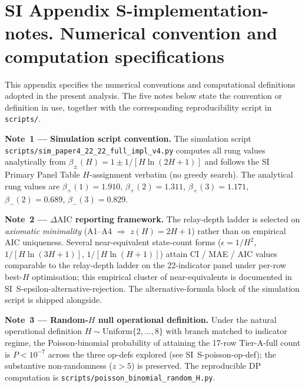
\clearpage
\section*{SI Appendix S-implementation-notes. Numerical convention and computation specifications}\label{sec:S-KNOWN-ISSUES-integrated}

\sloppy
This appendix specifies the numerical conventions and computational definitions adopted in the present analysis. The five notes below state the convention or definition in use, together with the corresponding reproducibility script in \texttt{scripts/}.

\textbf{Note~1 --- Simulation script convention.} The simulation script \texttt{scripts/sim\_paper4\_22\_22\_full\_impl\_v4.py} computes all rung values analytically from $\beta_{\pm}(H)=1\pm 1/[H\ln(2H+1)]$ and follows the SI Primary Panel Table $H$-assignment verbatim (no greedy search). The analytical rung values are $\beta_+(1)=1.910$, $\beta_+(2)=1.311$, $\beta_+(3)=1.171$, $\beta_-(2)=0.689$, $\beta_-(3)=0.829$.

\textbf{Note~2 --- $\Delta\mathrm{AIC}$ reporting framework.} The relay-depth ladder is selected on \emph{axiomatic minimality} (A1--A4 $\Rightarrow$ $z(H)=2H+1$) rather than on empirical AIC uniqueness. Several near-equivalent state-count forms ($\epsilon\!=\!1/H^{2}$, $1/[H\ln(3H+1)]$, $1/[H\ln(H+1)]$) attain CI / MAE / AIC values comparable to the relay-depth ladder on the 22-indicator panel under per-row best-$H$ optimisation; this empirical cluster of near-equivalents is documented in SI~\textsf{S-epsilon-alternative-rejection}. The alternative-formula block of the simulation script is shipped alongside.

\textbf{Note~3 --- Random-$H$ null operational definition.} Under the natural operational definition $H\!\sim\!\mathrm{Uniform}\{2,\dots,8\}$ with branch matched to indicator regime, the Poisson-binomial probability of attaining the 17-row Tier-A-full count is $P\!<\!10^{-7}$ across the three op-defs explored (see SI~\textsf{S-poisson-op-def}); the substantive non-randomness ($z\!>\!5$) is preserved. The reproducible DP computation is \texttt{scripts/poisson\_binomial\_random\_H.py}.

